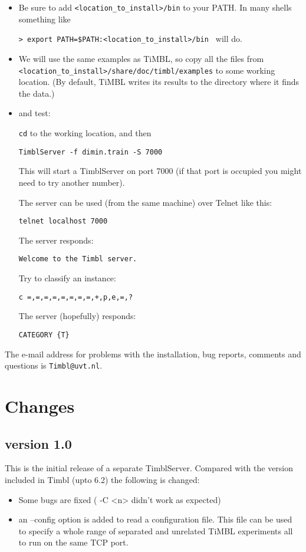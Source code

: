 \documentclass{report}
\begin{document}
\begin{itemize}
\item Be sure to add {\tt <location\_to\_install>/bin} to your PATH. 
In many shells something like

 {\tt > export PATH=\$PATH:<location\_to\_install>/bin }
will do.
\item We will use the same examples as TiMBL, so copy all the files from {\tt
  <location\_to\_install>/share/doc/timbl/examples} to some working
location. (By default, TiMBL writes its results to the directory where
it finds the data.)
\item and test:

{\tt cd} to the working location, and then

{\tt TimblServer -f dimin.train -S 7000}

This will start a TimblServer on port 7000 (if that port is occupied you might need to try another number).

The server can be used (from the same machine) over Telnet like this:

{\tt telnet localhost 7000 }

The server responds:

{\tt Welcome to the Timbl server.}

Try to classify an instance:

{\tt c =,=,=,=,=,=,=,=,+,p,e,=,? }

The server (hopefully) responds:

{\tt CATEGORY \{T\} }

\end{itemize}

The e-mail address for problems with the installation, bug reports, comments and questions is {\tt Timbl@uvt.nl}.

\chapter{Changes}
\label{changes}

\section{version 1.0}

This is the initial release of a separate TimblServer.
Compared with the version included in Timbl (upto 6.2) the following is changed:

\begin{itemize}

\item Some bugs are fixed ( -C <n> didn't work as expected)
\item an --config option is added to read a configuration file. This file can be used to specify a whole range of separated and unrelated TiMBL experiments all to run on the same TCP port. 

\end{itemize}
\end{document}
